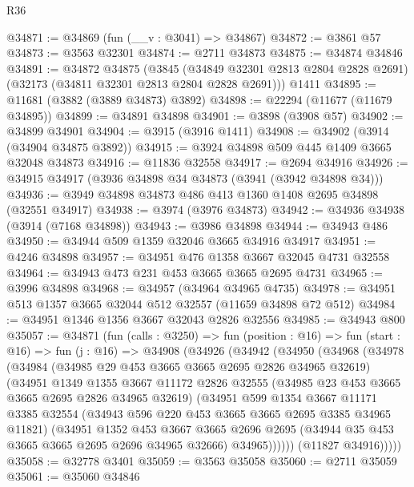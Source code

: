 \begin{lexlean}{R36}
\begin{coremodule}
@34871 := @34869 (fun (__v : @3041) => @34867)
@34872 := @3861 @57
@34873 := @3563 @32301
@34874 := @2711 @34873
@34875 := @34874 @34846
@34891 := @34872
    @34875
    (@3845 (@34849 @32301 @2813 @2804 @2828 @2691) (@32173 (@34811 @32301 @2813 @2804 @2828 @2691)))
    @1411
@34895 := @11681 (@3882 (@3889 @34873) @3892)
@34898 := @22294 (@11677 (@11679 @34895))
@34899 := @34891 @34898
@34901 := @3898 (@3908 @57)
@34902 := @34899 @34901
@34904 := @3915 (@3916 @1411)
@34908 := @34902 (@3914 (@34904 @34875 @3892))
@34915 := @3924 @34898 @509 @445 @1409 @3665 @32048 @34873
@34916 := @11836 @32558
@34917 := @2694 @34916
@34926 := @34915 @34917 (@3936 @34898 @34 @34873 (@3941 (@3942 @34898 @34)))
@34936 := @3949 @34898 @34873 @486 @413 @1360 @1408 @2695 @34898 (@32551 @34917)
@34938 := @3974 (@3976 @34873)
@34942 := @34936 @34938 (@3914 (@7168 @34898))
@34943 := @3986 @34898
@34944 := @34943 @486
@34950 := @34944 @509 @1359 @32046 @3665 @34916 @34917
@34951 := @4246 @34898
@34957 := @34951 @476 @1358 @3667 @32045 @4731 @32558
@34964 := @34943 @473 @231 @453 @3665 @3665 @2695 @4731
@34965 := @3996 @34898
@34968 := @34957 (@34964 @34965 @4735)
@34978 := @34951 @513 @1357 @3665 @32044 @512 @32557 (@11659 @34898 @72 @512)
@34984 := @34951 @1346 @1356 @3667 @32043 @2826 @32556
@34985 := @34943 @800
@35057 := @34871
    (fun (calls : @3250) =>
    fun (position : @16) =>
    fun (start : @16) =>
    fun (j : @16) =>
    @34908
      (@34926
        (@34942
          (@34950
            (@34968
              (@34978
                (@34984
                  (@34985 @29 @453 @3665 @3665 @2695 @2826 @34965 @32619)
                  (@34951
                    @1349
                    @1355
                    @3667
                    @11172
                    @2826
                    @32555
                    (@34985 @23 @453 @3665 @3665 @2695 @2826 @34965 @32619)
                    (@34951
                      @599
                      @1354
                      @3667
                      @11171
                      @3385
                      @32554
                      (@34943 @596 @220 @453 @3665 @3665 @2695 @3385 @34965 @11821)
                      (@34951
                        @1352
                        @453
                        @3667
                        @3665
                        @2696
                        @2695
                        (@34944 @35 @453 @3665 @3665 @2695 @2696 @34965 @32666)
                        @34965))))))
            (@11827 @34916)))))
@35058 := @32778 @3401
@35059 := @3563 @35058
@35060 := @2711 @35059
@35061 := @35060 @34846

\end{coremodule}
\end{lexlean}

